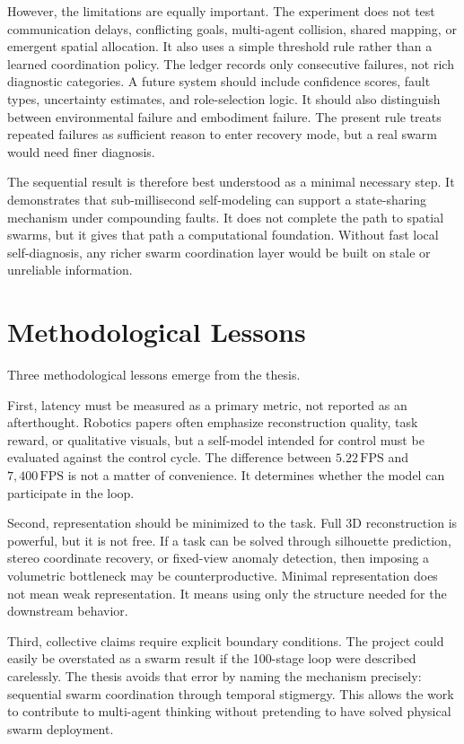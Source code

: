 \documentclass[12pt,a4paper,oneside]{report}
\begin{document}
However, the limitations are equally important. The experiment does not test communication delays, conflicting goals, multi-agent collision, shared mapping, or emergent spatial allocation. It also uses a simple threshold rule rather than a learned coordination policy. The ledger records only consecutive failures, not rich diagnostic categories. A future system should include confidence scores, fault types, uncertainty estimates, and role-selection logic. It should also distinguish between environmental failure and embodiment failure. The present rule treats repeated failures as sufficient reason to enter recovery mode, but a real swarm would need finer diagnosis.

The sequential result is therefore best understood as a minimal necessary step. It demonstrates that sub-millisecond self-modeling can support a state-sharing mechanism under compounding faults. It does not complete the path to spatial swarms, but it gives that path a computational foundation. Without fast local self-diagnosis, any richer swarm coordination layer would be built on stale or unreliable information.

\section{Methodological Lessons}

Three methodological lessons emerge from the thesis.

First, latency must be measured as a primary metric, not reported as an afterthought. Robotics papers often emphasize reconstruction quality, task reward, or qualitative visuals, but a self-model intended for control must be evaluated against the control cycle. The difference between $5.22\,\mathrm{FPS}$ and $7{,}400\,\mathrm{FPS}$ is not a matter of convenience. It determines whether the model can participate in the loop.

Second, representation should be minimized to the task. Full 3D reconstruction is powerful, but it is not free. If a task can be solved through silhouette prediction, stereo coordinate recovery, or fixed-view anomaly detection, then imposing a volumetric bottleneck may be counterproductive. Minimal representation does not mean weak representation. It means using only the structure needed for the downstream behavior.

Third, collective claims require explicit boundary conditions. The project could easily be overstated as a swarm result if the 100-stage loop were described carelessly. The thesis avoids that error by naming the mechanism precisely: sequential swarm coordination through temporal stigmergy. This allows the work to contribute to multi-agent thinking without pretending to have solved physical swarm deployment.
\end{document}
